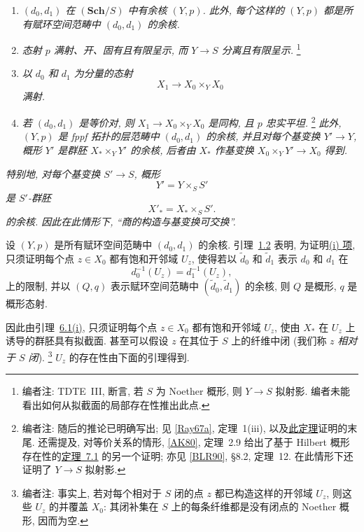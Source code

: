 \begin{enumerate}
\item[(i)]\label{thm:sga3-V-7.1-i}%
  \emph{\((d_0,d_1)\) 在 \((\mathbf{Sch}/S)\) 中有余核 \((Y,p)\).
  此外, 每个这样的 \((Y,p)\) 都是所有赋环空间范畴中
  \((d_0,d_1)\) 的余核.}
\item[(ii)]\label{thm:sga3-V-7.1-ii}%
  \emph{态射 \(p\) 满射、开、固有且有限呈示,
  而 \(Y\to S\) 分离且有限呈示.}%
  \footnote{\label{note:sga3-V-36}编者注: TDTE~III,
   断言, 若 \(S\) 为 Noether 概形,
  则 \(Y\to S\) 拟射影. 编者未能看出如何从拟截面的局部存在性推出此点.}
\item[(iii)]\label{thm:sga3-V-7.1-iii}%
  \emph{以 \(d_0\) 和 \(d_1\) 为分量的态射
  \[
    X_1\longrightarrow X_0\times_Y X_0
  \]
  满射.}
\item[(iv)]\label{thm:sga3-V-7.1-iv}%
  \emph{若 \((d_0,d_1)\) 是等价对,
  则 \(X_1\to X_0\times_Y X_0\) 是同构, 且 \(p\) 忠实平坦.}%
  \footnote{\label{note:sga3-V-37}编者注: 随后的推论已明确写出;
  见 \hyperref[bib:sga3-V-Ray67a]{[Ray67a]}, 定理~1(iii),
  以及\hyperref[thm:sga3-V-7.1]{此定理}证明的末尾.
  还需提及, 对等价关系的情形,
  \hyperref[bib:sga3-V-AK80]{[AK80]}, 定理~2.9
  给出了基于 Hilbert 概形存在性的\hyperref[thm:sga3-V-7.1]{定理~7.1} 的另一个证明;
  亦见 \hyperref[bib:sga3-V-BLR90]{[BLR90]}, \S8.2, 定理~12.
  在此情形下还证明了 \(Y\to S\) 拟射影.}
  \emph{此外, \((Y,p)\) 是 fppf 拓扑的层范畴中 \((d_0,d_1)\) 的余核,
  并且对每个基变换 \(Y'\to Y\), 概形 \(Y'\) 是群胚
  \(X_\ast\times_Y Y'\) 的余核,
  后者由 \(X_\ast\) 作基变换 \(X_0\times_Y Y'\to X_0\) 得到.}
\end{enumerate}

\emph{特别地, 对每个基变换 \(S'\to S\), 概形
\[
  Y'=Y\times_S S'
\]
是 \(S'\)-群胚
\[
  X'_\ast=X_\ast\times_S S'.
\]
的余核. 因此在此情形下, \textquotedblleft{}商的构造与基变换可交换\textquotedblright.}

设 \((Y,p)\) 是所有赋环空间范畴中 \((d_0,d_1)\) 的余核.
引理~\hyperref[sga3:exp5:lemma:1.2]{1.2} 表明,
为证明\hyperref[thm:sga3-V-7.1-i]{(i) 项},
只须证明每个点 \(z\in X_0\) 都有饱和开邻域 \(U_z\),
使得若以 \(\widetilde d_0\) 和 \(\widetilde d_1\)
表示 \(d_0\) 和 \(d_1\) 在
\[
  d_0^{-1}(U_z)=d_1^{-1}(U_z),
\]
上的限制, 并以 \((Q,q)\) 表示赋环空间范畴中
\((\widetilde d_0,\widetilde d_1)\) 的余核,
则 \(Q\) 是概形, \(q\) 是概形态射.

因此由引理~\hyperref[lem:sga3-V-6.1-i]{6.1(i)},
只须证明每个点 \(z\in X_0\) 都有饱和开邻域 \(U_z\),
使由 \(X_\ast\) 在 \(U_z\) 上诱导的群胚具有拟截面.
甚至可以假设 \(z\) 在其位于 \(S\) 上的纤维中闭
(我们称 \(z\) \emph{相对于 \(S\) 闭}).%
\footnote{\label{note:sga3-V-38}编者注: 事实上,
若对每个相对于 \(S\) 闭的点 \(z\) 都已构造这样的开邻域 \(U_z\),
则这些 \(U_z\) 的并覆盖 \(X_0\):
其闭补集在 \(S\) 上的每条纤维都是没有闭点的 Noether 概形, 因而为空.}
\(U_z\) 的存在性由下面的引理得到.

